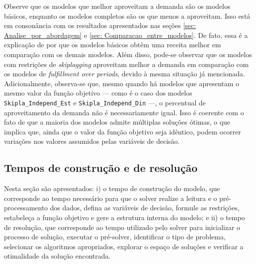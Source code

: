 Observe que os modelos que melhor aproveitam a demanda são os modelos básicos, enquanto os modelos completos são os que menos a aproveitam. Isso está em consonância com os resultados apresentados nas seções \ref{sec: Analise_por_abordagem} e \ref{sec: Comparacao_entre_modelos}. De fato, essa é a explicação de por que os modelos básicos obtêm uma receita melhor em comparação com os demais modelos. Além disso, pode-se observar que os modelos com restrições de \textit{skiplagging} aproveitam melhor a demanda em comparação com os modelos de \textit{fulfillment over periods}, devido à mesma situação já mencionada. Adicionalmente, observa-se que, mesmo quando há modelos que apresentam o mesmo valor da função objetivo — como é o caso dos modelos \texttt{Skipla\_Independ\_Est} e \texttt{Skipla\_Independ\_Din} —, o percentual de aproveitamento da demanda não é necessariamente igual. Isso é coerente com o fato de que a maioria dos modelos admite múltiplas soluções ótimas, o que implica que, ainda que o valor da função objetivo seja idêntico, podem ocorrer variações nos valores assumidos pelas variáveis de decisão.




\subsection{Tempos de construção e de resolução}
Nesta seção são apresentados: i) o tempo de construção do modelo, que corresponde ao tempo necessário para que o solver realize a leitura e o pré-processamento dos dados, defina as variáveis de decisão, formule as restrições, estabeleça a função objetivo e gere a estrutura interna do modelo; e ii) o tempo de resolução, que corresponde ao tempo utilizado pelo solver para inicializar o processo de solução, executar o pré-solver, identificar o tipo de problema, selecionar os algoritmos apropriados, explorar o espaço de soluções e verificar a otimalidade da solução encontrada.


